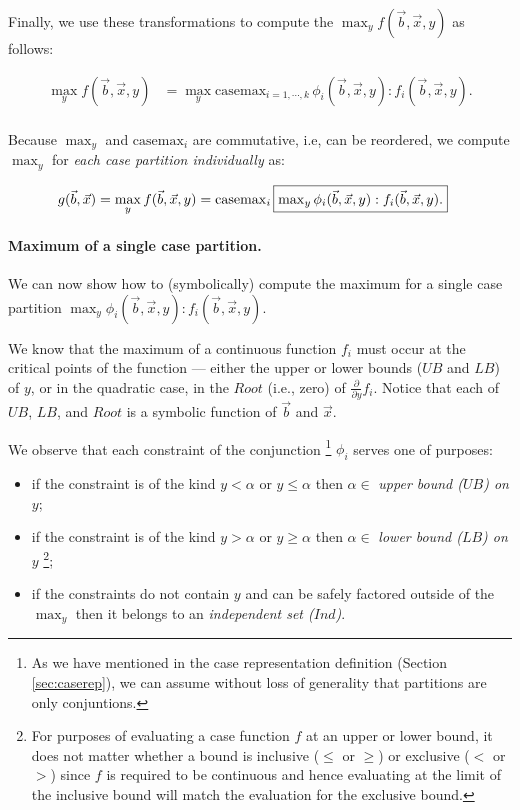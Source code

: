 \documentclass[twoside,11pt]{article}
\newcommand{\casemax}{\mathrm{casemax}}
\newcommand{\UB}{\mathit{UB}}
\newcommand{\LB}{\mathit{LB}}
\newcommand{\IND}{\mathit{Ind}}
\newcommand{\Root}{\mathit{Root}}
\begin{document}
Finally, we use these transformations to compute the $\max_y f(\vec{b},\vec{x},y)$ as follows:

\begin{align}
\max_y f(\vec{b},\vec{x},y) & = 
\max_y \casemax_{i=1,\cdots,k} \, 
\phi_i(\vec{b},\vec{x},y) : f_i(\vec{b},\vec{x},y). \nonumber \\
\end{align} 

Because 
$\max_y$ and $\casemax_i$ are commutative, i.e, can be reordered,
we compute $\max_y$ for \emph{each case partition
individually} as:  

\begin{align}
g(\vec{b},\vec{x}) = \max_y f(\vec{b},\vec{x},y)& = \casemax_i \, \fbox{$\max_y 
\phi_i(\vec{b},\vec{x},y) : f_i(\vec{b},\vec{x},y).$} \label{eq:casemax_max}
\end{align} 


\paragraph{Maximum of a single case partition.} We can now show how to (symbolically) compute the maximum for a single case partition 
$\max_y \phi_i(\vec{b},\vec{x},y): f_i(\vec{b},\vec{x},y)$.

We know that the maximum of a continuous function $f_i$ must occur at the critical points of the function --- 
either the upper or lower bounds ($\UB$ and $\LB$) of $y$, 
or in the quadratic case, in the $\Root$ (i.e., zero) of $\frac{\partial}{\partial y} f_i$.  Notice that each of $\UB$, $\LB$, and $\Root$
is a symbolic function of $\vec{b}$ and $\vec{x}$. 

We observe that each constraint of the conjunction \footnote{As we have mentioned in the case representation definition (Section \ref{sec:caserep}), we can assume without loss of generality that partitions are only conjuntions.} $\phi_i$ serves one of
purposes: 
\begin{itemize}
\item if the constraint is of the kind
$y < \alpha$ or $y \leq \alpha$ then 
$\alpha \in$ \emph{upper bound ($\UB$) on $y$};
\item if the constraint is of the kind
$y >\alpha$ or $y \geq \alpha$ then
$\alpha \in$ \emph{lower bound ($\LB$) on $y$}
\footnote{For purposes of evaluating
a case function $f$ at an upper or lower bound,
it does not matter whether a bound is inclusive ($\leq$ or $\geq$)
or exclusive ($<$ or $>$) since $f$ is required to be continuous
and hence evaluating at the limit of the inclusive bound will
match the evaluation for the exclusive bound.};
\item if the constraints do not contain $y$
and can be safely factored outside of the $\max_y$ then it belongs to an \emph{independent set ($\IND$)}. 
\end{itemize}
\end{document}
